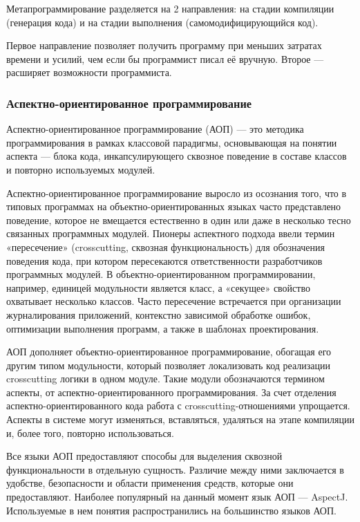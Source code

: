 \documentclass[a4paper,12pt,titlepage]{extarticle}
\begin{document}
Метапрограммирование разделяется на 2 направления: на стадии
компиляции (генерация кода) и на стадии выполнения (самомодифицирующийся код).

Первое направление позволяет получить программу при меньших затратах времени и
усилий, чем если бы программист писал её вручную. Второе — расширяет
возможности программиста.

\subsubsection*{Аспектно-ориентированное программирование}
\label{aop}
Аспектно-ориентированное программирование (АОП) — это методика программирования
в рамках классовой парадигмы, основывающая на понятии аспекта — блока кода,
инкапсулирующего сквозное поведение в составе классов и повторно используемых
модулей.

Аспектно-ориентированное программирование выросло из осознания того, что в
типовых программах на объектно-ориентированных языках часто представлено
поведение, которое не вмещается естественно в один или даже в несколько тесно
связанных программных модулей. Пионеры аспектного подхода ввели термин
«пересечение» (crosscutting, сквозная функциональность) для обозначения
поведения кода, при котором пересекаются ответственности разработчиков
программных модулей. В объектно-ориентированном программировании, например,
единицей модульности является класс, а «секущее» свойство охватывает несколько
классов. Часто пересечение встречается при организации журналирования
приложений, контекстно зависимой обработке ошибок, оптимизации выполнения
программ, а также в шаблонах проектирования.

АОП дополняет объектно-ориентированное программирование, обогащая его другим
типом модульности, который позволяет локализовать код реализации crosscutting
логики в одном модуле. Такие модули обозначаются термином аспекты, от
аспектно-ориентированного программирования. За счет отделения
аспектно-ориентированного кода работа с crosscutting-отношениями упрощается.
Аспекты в системе могут изменяться, вставляться, удаляться на этапе компиляции
и, более того, повторно использоваться.

Все языки АОП предоставляют способы для выделения сквозной функциональности в
отдельную сущность. Различие между ними заключается в удобстве, безопасности и
области применения средств, которые они предоставляют. Наиболее популярный на
данный момент язык АОП — AspectJ. Используемые в нем понятия распространились
на большинство языков АОП.
\end{document}
